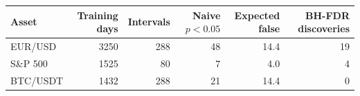 \begin{tabular}{lrrrrr}
\toprule
Asset & Training days & Intervals & Naive $p<0.05$ & Expected false & BH-FDR discoveries \\
\midrule
EUR/USD & 3250 & 288 & 48 & 14.4 & 19 \\
S\&P 500 & 1525 & 80 & 7 & 4.0 & 4 \\
BTC/USDT & 1432 & 288 & 21 & 14.4 & 0 \\
\bottomrule
\end{tabular}